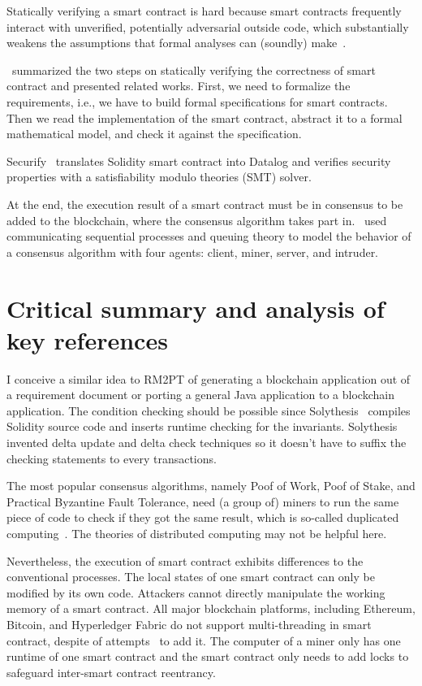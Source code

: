 Statically verifying a smart contract is hard because
smart contracts frequently interact with unverified, potentially adversarial outside code, which substantially weakens the assumptions that formal analyses can (soundly) make~\cite{bram2021rich}.

\cite{tolmach2021survey}~summarized the two steps on statically verifying the correctness of smart contract and presented related works.
First, we need to formalize the requirements, i.e., we have to build formal specifications for smart contracts.
Then we read the implementation of the smart contract, abstract it to a formal mathematical model, and check it against the specification.

Securify~\cite{tsankov2018securify} translates Solidity smart contract into Datalog and verifies security properties with a satisfiability modulo theories (SMT) solver.



At the end, the execution result of a smart contract must be in consensus to be added to the blockchain, where the consensus algorithm takes part in.
\cite{altarawneh2021availability}~used communicating sequential processes and queuing theory to model the behavior of a consensus algorithm with four agents: client, miner, server, and intruder.





\section{Critical summary and analysis of key references}


I conceive a similar idea to RM2PT of generating a blockchain application out of a requirement document or porting a general Java application to a blockchain application. The condition checking should be possible since Solythesis~\cite{li2020securing} compiles Solidity source code and inserts runtime checking for the invariants. Solythesis invented delta update and delta check techniques so it doesn't have to suffix the checking statements to every transactions.

The most popular consensus algorithms, namely Poof of Work, Poof of Stake, and Practical Byzantine Fault Tolerance, need (a group of) miners to run the same piece of code to check if they got the same result, which is so-called duplicated computing~\cite{shae2018transform}. The theories of distributed computing may not be helpful here.

Nevertheless, the execution of smart contract exhibits differences to the conventional processes.
The local states of one smart contract can only be modified by its own code. Attackers cannot directly manipulate the working memory of a smart contract.
All major blockchain platforms, including Ethereum, Bitcoin, and Hyperledger Fabric do not support multi-threading in smart contract, despite of attempts~\cite{anjana2019efficient,yu2018parallel} to add it. The computer of a miner only has one runtime of one smart contract and the smart contract only needs to add locks to safeguard inter-smart contract reentrancy.

